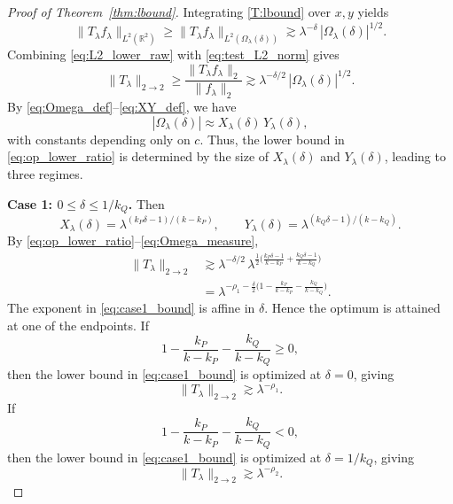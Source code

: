 \documentclass[10pt,a4paper]{amsart}
\newcommand{\R}{\mathbb{R}}
\begin{document}
\begin{proof}[Proof of Theorem~\ref{thm:lbound}]
		Integrating \eqref{T:lbound} over $x,y$ yields
		\begin{equation}\label{eq:L2_lower_raw}
			\|T_\lambda f_\lambda\|_{L^2(\R^2)}
			\ge \|T_\lambda f_\lambda\|_{L^2(\Omega_\lambda(\delta))}
			\gtrsim \lambda^{-\delta}\,|\Omega_\lambda(\delta)|^{1/2}.
		\end{equation}
		Combining \eqref{eq:L2_lower_raw} with \eqref{eq:test_L2_norm} gives
		\begin{equation}\label{eq:op_lower_ratio}
			\|T_\lambda\|_{2\to2}
			\ge \frac{\|T_\lambda f_\lambda\|_2}{\|f_\lambda\|_2}
			\gtrsim \lambda^{-\delta/2}\,|\Omega_\lambda(\delta)|^{1/2}.
		\end{equation}
		By \eqref{eq:Omega_def}--\eqref{eq:XY_def}, we have
		\begin{equation}\label{eq:Omega_measure}
			|\Omega_\lambda(\delta)| \approx X_\lambda(\delta)\,Y_\lambda(\delta),
		\end{equation}
		with constants depending only on $c$.
		Thus, the lower bound in \eqref{eq:op_lower_ratio} is determined by the size of
		$X_\lambda(\delta)$ and $Y_\lambda(\delta)$, leading to three regimes.
		
		\smallskip
		\noindent\textbf{Case 1: $0\le \delta\le 1/k_Q$.}
		Then
		\[
		X_\lambda(\delta)=\lambda^{(k_P\delta-1)/(k-k_P)},
		\qquad
		Y_\lambda(\delta)=\lambda^{(k_Q\delta-1)/(k-k_Q)}.
		\]
		By \eqref{eq:op_lower_ratio}--\eqref{eq:Omega_measure},
		\begin{align}
			\|T_\lambda\|_{2\to2}
			&\gtrsim \lambda^{-\delta/2}\,
			\lambda^{\frac12\bigl(\frac{k_P\delta-1}{k-k_P}+\frac{k_Q\delta-1}{k-k_Q}\bigr)}\nonumber\\
			&=\lambda^{-\rho_1-\frac{\delta}{2}\bigl(1-\frac{k_P}{k-k_P}-\frac{k_Q}{k-k_Q}\bigr)}.\label{eq:case1_bound}
		\end{align}
		The exponent in \eqref{eq:case1_bound} is affine in $\delta$. Hence the optimum is attained at one of the endpoints.
		If
		\[
		1-\frac{k_P}{k-k_P}-\frac{k_Q}{k-k_Q}\ge 0,
		\]
		then the lower bound in \eqref{eq:case1_bound} is optimized at $\delta=0$, giving
		\[
		\|T_\lambda\|_{2\to2}\gtrsim \lambda^{-\rho_1}.
		\]
		If
		\[
		1-\frac{k_P}{k-k_P}-\frac{k_Q}{k-k_Q}<0,
		\]
		then the lower bound in \eqref{eq:case1_bound} is optimized at $\delta=1/k_Q$, giving
		\[
		\|T_\lambda\|_{2\to2}\gtrsim \lambda^{-\rho_2}.
		\]
		

\end{proof}
\end{document}
